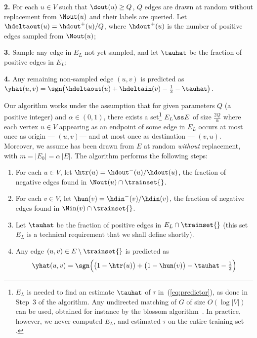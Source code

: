 \textbf{2.} For each $u \in V$ such that $\dout(u) \ge Q$, $Q$ edges are drawn at random without
replacement from $\Nout(u)$ and their labels are queried. Let $ \hdeltaout(u) = \hdout^+(u)/Q $,
where $\hdout^+(u)$ is the number of positive edges sampled from $\Nout(u)$;

\textbf{3.} Sample any edge in $E_L$ not yet sampled, and let $\tauhat$ be the fraction of positive
edges in $E_L$;

\textbf{4.} Any remaining non-sampled edge $(u,v)$ is predicted as $ \yhat(u,v) =
\sgn\big(\hdeltaout(u) + \hdeltain(v) - \tfrac{1}{2} - \tauhat \big) $.

Our algorithm works under the assumption that for given parameters $Q$ (a positive integer) and
$\alpha \in (0,1)$, there exists a set\footnote{$E_L$ is needed to find an estimate $\tauhat$ of
$\tau$ in~(\ref{eq:predictor}), as done in Step~3 of the algorithm. Any undirected matching of $G$ of
size $O(\log|V|)$ can be used, obtained for instance by the blossom algorithm~\autocite{matching65}.
In practice, however, we never computed $E_L$, and estimated $\tau$
on the entire training set \trainset{}.} $E_L \ss E$ of size $\tfrac{2Q}{\alpha}$ where each vertex
$u \in V$ appearing as an endpoint of some edge in $E_L$ occurs at most once as origin ---\ie{}
$(u,v)$--- and at most once as destination ---\ie{} $(v,u)$. Moreover, we assume \trainset{} has
been drawn from $E$ at random {\em without} replacement, with $m = |E_0| = \alpha\,|E|$. The
algorithm performs the following steps:
\fi

\begin{enumerate}[label=\textbf{\arabic*.}]
	\item For each $u \in V$, let $\htr(u) = \hdout^-(u)/\hdout(u)$, \ie{} the fraction of
	  negative edges found in $\Nout(u) \cap \trainset{}$.

	\item For each $v \in V$, let $\hun(v) = \hdin^-(v)/\hdin(v)$, \ie{} the fraction of
	  negative edges found in $\Nin(v) \cap \trainset{}$.

	\item Let $\tauhat$ be the fraction of positive edges in $E_L\cap \trainset{}$ (this set
	  $E_L$ is a technical requirement that we shall define shortly).

	\item Any edge $(u,v) \in E\setminus \trainset{}$ is predicted as
		$$
		\yhat(u,v) = \sgn\Big(\big(1-\htr(u)\big) + \big(1-\hun(v)\big) -\tauhat - \tfrac{1}{2}\Big)
		$$
\end{enumerate}

